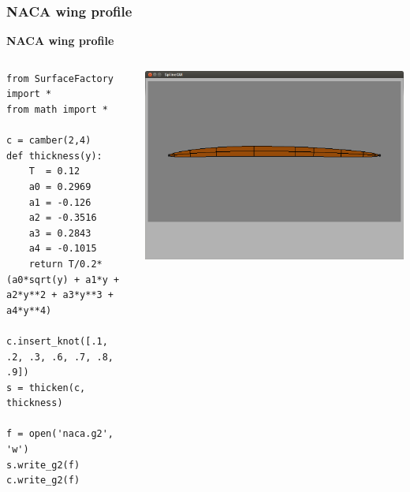 \documentclass{beamer}
\theoremstyle{plain}
\theoremstyle{definition}
\begin{document}
\begin{frame}[fragile]
\frametitle{NACA wing profile}
\textbf{NACA wing profile}

\begin{columns}
    \begin{column}{.50\linewidth}
        \begin{listing}[H]
            \tiny
            \begin{verbatim}
from SurfaceFactory import *
from math import *

c = camber(2,4)
def thickness(y):
    T  = 0.12
    a0 = 0.2969
    a1 = -0.126
    a2 = -0.3516
    a3 = 0.2843
    a4 = -0.1015
    return T/0.2*(a0*sqrt(y) + a1*y + a2*y**2 + a3*y**3 + a4*y**4)
    
c.insert_knot([.1, .2, .3, .6, .7, .8, .9])
s = thicken(c, thickness)

f = open('naca.g2', 'w')
s.write_g2(f)
c.write_g2(f)

            \end{verbatim}
        \end{listing}
    \end{column}
    \begin{column}{.45\linewidth}
        \includegraphics[width=\linewidth]{naca4}
    \end{column}
\end{columns}
\end{frame}

\end{document}
